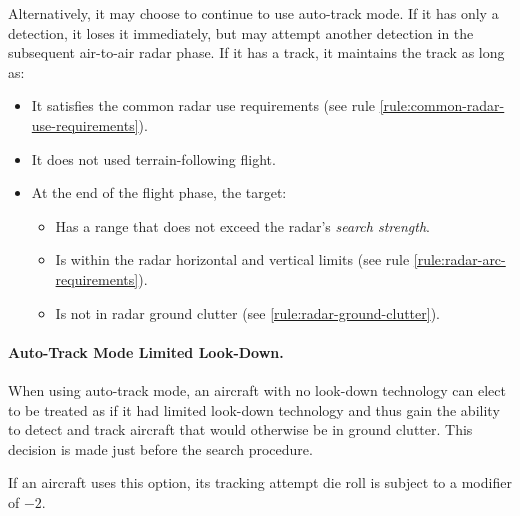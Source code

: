 {\begin{advancedrules}
Alternatively, it may choose to continue to use auto-track mode. If it has only a detection, it loses it immediately, but may attempt another detection in the subsequent air-to-air radar phase. If it has a track, it maintains the track as long as:
\begin{itemize}
    \item It satisfies the common radar use requirements (see rule \ref{rule:common-radar-use-requirements}).
    \item It does not used terrain-following flight.
    \item At the end of the flight phase, the target:
    \begin{itemize}
        \item Has a range that does not exceed the radar's \emph{search strength}.
        \item Is within the radar horizontal and vertical limits (see rule \ref{rule:radar-arc-requirements}).
        \item Is not in radar ground clutter (see  \ref{rule:radar-ground-clutter}).
    \end{itemize}
\end{itemize}


\paragraph{Auto-Track Mode Limited Look-Down.}

When using auto-track mode, an aircraft with no look-down technology can elect to be treated as if it had limited look-down technology and thus gain the ability to detect and track aircraft that would otherwise be in ground clutter. This decision is made just before the search procedure. 

If an aircraft uses this option, its tracking attempt die roll is subject to a modifier of $-2$. 

\end{advancedrules}

}

